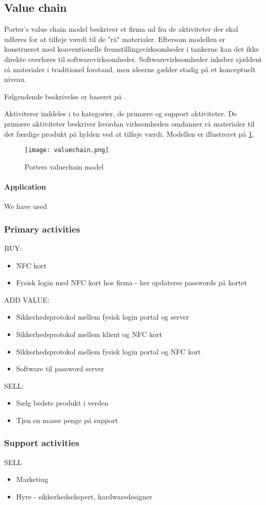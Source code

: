 \subsection{Value chain}


Porter's value chain model beskriver et firma ud fra de aktiviteter der skal udføres for at tilføje værdi til de "rå" materialer.
Eftersom modellen er konstrueret med konventionelle fremstillingsvirksomheder i tankerne kan det ikke direkte overføres til softwarevirksomheder.
Softwarevirksomheder inkøber sjældent rå materialer i traditionel forstand, men ideerne gælder stadig på et konceptuelt niveau.

Følgendende beskrivelse er baseret på \citet[p.~12]{rose2012software}.

Aktiviterer inddeles i to kategorier, de primære og support aktiviteter.
De primære aktiviteter beskriver hvordan virksomheden omdanner rå materialer til det færdige produkt på hylden ved at tilføje værdi.
Modellen er illustreret på  \cref{valuechain}.

\begin{figure}
	\texttt{[image: valuechain.png]}
	\caption{Porters valuechain model}
	\label{valuechain}
\end{figure}

\paragraph{Application}
We have used 

\subsubsection*{Primary activities}
BUY:
\begin{itemize}
\item NFC kort
\item Fysisk login med NFC kort hos firma - her opdateres passwords på kortet
\end{itemize}
ADD VALUE:
\begin{itemize}
\item Sikkerhedsprotokol mellem fysisk login portal og server
\item Sikkerhedsprotokol mellem klient og NFC kort
\item Sikkerhedsprotokol mellem fysisk login portal og NFC kort
\item Software til password server
\end{itemize}
SELL:
\begin{itemize}
\item Sælg bedste produkt i verden
\item Tjen en masse penge på support
\end{itemize}

\subsubsection*{Support activities}
SELL
\begin{itemize}
\item Marketing
\item Hyre - sikkerhedsekspert, hardwaredesigner
\end{itemize}